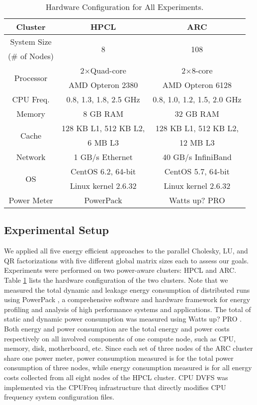 \documentclass[12pt]{elsarticle}
\begin{document}
\begin{table}[h]
\scriptsize \centering
\caption{Hardware Configuration for All Experiments.}
\label{hardware_configuration}
\begin{tabular}{|c|c|c|}
\hline
Cluster & HPCL & ARC\\
\hline
System Size & \multirow{2}{*}{8} & \multirow{2}{*}{108}\\
(\# of Nodes) & &\\
\hline
\multirow{2}{*}{Processor} & 2$\times$Quad-core & 2$\times$8-core\\
& AMD Opteron 2380 & AMD Opteron 6128\\
\hline
CPU Freq. & 0.8, 1.3, 1.8, 2.5 GHz & 0.8, 1.0, 1.2, 1.5, 2.0 GHz\\
\hline
Memory & 8 GB RAM & 32 GB RAM\\
\hline
\multirow{2}{*}{Cache} & 128 KB L1, 512 KB L2, & 128 KB L1, 512 KB L2,\\
& 6 MB L3 & 12 MB L3\\
\hline
Network & 1 GB/s Ethernet & 40 GB/s InfiniBand\\
\hline
\multirow{2}{*}{OS} & CentOS 6.2, 64-bit & CentOS 5.7, 64-bit\\
& Linux kernel 2.6.32 & Linux kernel 2.6.32\\
\hline
Power Meter & PowerPack & Watts up? PRO\\
\hline
\end{tabular}
\normalsize
\end{table}

\subsection{Experimental Setup}

We applied all five energy efficient approaches to the parallel Cholesky, LU, and QR factorizations with five different global matrix sizes each to assess our goals. Experiments were performed on two power-aware clusters: HPCL and ARC. Table \ref{hardware_configuration} lists the hardware configuration of the two clusters. Note that we measured the total dynamic and leakage energy consumption of distributed runs using PowerPack \cite{tpds10}, a comprehensive software and hardware framework for energy profiling and analysis of high performance systems and applications. The total of static and dynamic power consumption was measured using Watts up? PRO \cite{wattsup}. Both energy and power consumption are the total energy and power costs respectively on all involved components of one compute node, such as CPU, memory, disk, motherboard, etc. Since each set of three nodes of the ARC cluster share one power meter, power consumption measured is for the total power consumption of three nodes, while energy consumption measured is for all energy costs collected from all eight nodes of the HPCL cluster. CPU DVFS was implemented via the CPUFreq infrastructure \cite{cpufreq} that directly modifies CPU frequency system configuration files.
\end{document}
